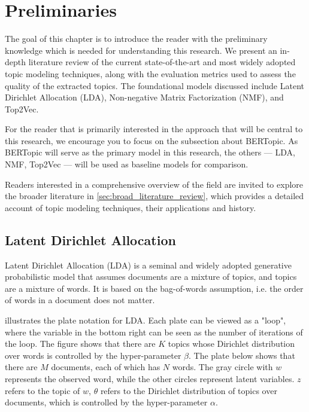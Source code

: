 \chapter{Preliminaries}
\label{chapter:preliminaries}
The goal of this chapter is to introduce the reader with the preliminary knowledge which is needed for understanding this research. We present an in-depth literature review of the current state-of-the-art and most widely adopted topic modeling techniques, along with the evaluation metrics used to assess the quality of the extracted topics. The foundational models discussed include Latent Dirichlet Allocation (LDA), Non-negative Matrix Factorization (NMF), and Top2Vec.

For the reader that is primarily interested in the approach that will be central to this research, we encourage you to focus on the subsection about BERTopic. As BERTopic will serve as the primary model in this research, the others — LDA, NMF, Top2Vec — will be used as baseline models for comparison.

Readers interested in a comprehensive overview of the field are invited to explore the broader literature in \cref{sec:broad_literature_review}, which provides a detailed account of topic modeling techniques, their applications and history.

\section{Latent Dirichlet Allocation}
\label{sec:latent_dirichlet_allocation}
Latent Dirichlet Allocation (LDA) \cite{blei_latent_2001} is a seminal and widely adopted generative probabilistic model that assumes documents are a mixture of topics, and topics are a mixture of words. It is based on the bag-of-words assumption, i.e. the order of words in a document does not matter.

 illustrates the plate notation for LDA. Each plate can be viewed as a "loop", where the variable in the bottom right can be seen as the number of iterations of the loop. The figure shows that there are $K$ topics whose Dirichlet distribution over words is controlled by the hyper-parameter $\beta$. The plate below shows that there are $M$ documents, each of which has $N$ words. The gray circle with $w$ represents the observed word, while the other circles represent latent variables. $z$ refers to the topic of $w$, $\theta$ refers to the Dirichlet distribution of topics over documents, which is controlled by the hyper-parameter $\alpha$.

